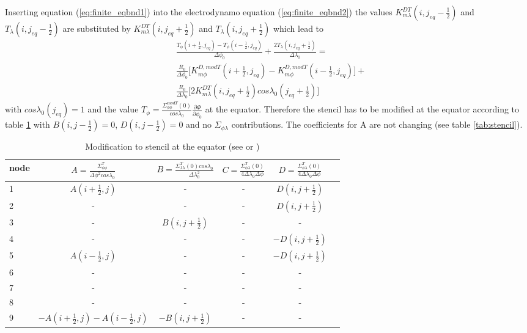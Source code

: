 %
Inserting equation (\ref{eq:finite_eqbnd1}) into the electrodynamo equation 
(\ref{eq:finite_eqbnd2}) the values $K_{m \lambda }^{DT}(i,j_{eq}-\frac{1}{2})$
and $T_{\lambda}(i,j_{eq}-\frac{1}{2})$ are substituted by $K_{m \lambda }^{DT}(i,j_{eq}+\frac{1}{2})$
and $T_{\lambda}(i,j_{eq}+\frac{1}{2})$ which lead to
%
\begin{equation}
   \begin{split}
    & \frac{T_{\phi}(i+\frac{1}{2},j_{eq})-
     T_{\phi}(i-\frac{1}{2},j_{eq})}{\Delta \phi_0} + \frac{ 2 T_{\lambda}(i,j_{eq}+\frac{1}{2})
     }{\Delta \lambda_0}  = \\
   &  \frac{R_0}{ \Delta \phi_0} \biggl[  K_{m \phi}^{D, mod T}(i+\frac{1}{2},j_{eq}) - 
      K_{m \phi}^{D, mod T}(i-\frac{1}{2},j_{eq})
     \biggr] 
     + \\
   & \frac{R_0}{ \Delta \lambda_0}\biggl[2 K_{m \lambda }^{DT}(i,j_{eq}+\frac{1}{2}) 
    cos \lambda_0(j_{eq}+\frac{1}{2}) \biggr]\label{eq:finite_eqbnd3}
   \end{split}
\end{equation}
%
with $cos \lambda_0(j_{eq})=1$ and the value $T_{\phi} = \frac{\Sigma_{\phi \phi}^{mod T}(0)}{cos
   \lambda_0} \frac{\partial \Phi}{\partial \phi_0}$ at the equator.
Therefore the stencil has to be modified at the equator according to
table \ref{tab:stencil_eq} with $B(i,j-\frac{1}{2})=0$, $D(i,j-\frac{1}{2}) =0$
and no $\Sigma_{\phi \lambda}$ contributions. The coefficients for
A are not changing (see table \ref{tab:stencil}).
%
\begin{table}[tb]
\begin{tabular}{|p{0.5cm} ||c|c|c|c|c|} \hline
 node  & $A=\frac{\Sigma_{\phi \phi}^T}{\Delta \phi^2 cos \lambda_0}$
       & $B= \frac{\Sigma_{\lambda \lambda}^T(0) cos \lambda_0}{\Delta \lambda_0^2}$
       & $C= \frac{\Sigma_{\phi \lambda}^T(0)}{4\Delta \lambda_0 \Delta \phi }$
       & $D= \frac{\Sigma_{\phi \lambda}^T(0)}{4 \Delta \lambda_0 \Delta \phi}$ \\ \hline \hline
%
1  &$A(i+\frac{1}{2},j)$ &- &-&$D(i,j+\frac{1}{2})$	  \\ 
2  &- &- &-&$D(i,j+\frac{1}{2})$   \\ 
3  &- &$ B(i,j+\frac{1}{2})$&- & -	\\ 
4  &- &- &- &$-D(i,j+\frac{1}{2})$	 \\ 
5  &$A(i-\frac{1}{2},j)$ & - &-& $-D(i,j+\frac{1}{2})$  \\ 
6  &- &- &-& - \\ 
7  &- & - &-&  -	 \\ 
8  &- & -&-& -\\ 
9  &$-A(i+\frac{1}{2},j)-A(i-\frac{1}{2},j)$ &$-B(i,j+\frac{1}{2})$ &-&-    \\ \hline
%
\end{tabular}
\caption{Modification to stencil at the equator (see
  or  )}
\label{tab:stencil_eq}
\end{table} 
\\

